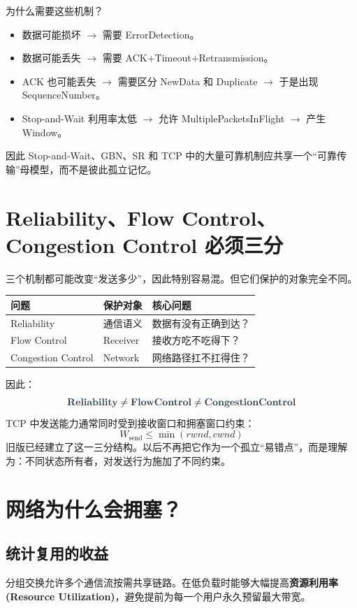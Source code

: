 \documentclass[11pt,a4paper,openany]{ctexbook}
\newcommand{\key}[1]{\textbf{\color{deep}#1}}
\begin{document}
为什么需要这些机制？
\begin{itemize}
    \item 数据可能损坏 $\rightarrow$ 需要 ErrorDetection。
    \item 数据可能丢失 $\rightarrow$ 需要 ACK+Timeout+Retransmission。
    \item ACK 也可能丢失 $\rightarrow$ 需要区分 NewData 和 Duplicate $\rightarrow$ 于是出现 SequenceNumber。
    \item Stop-and-Wait 利用率太低 $\rightarrow$ 允许 MultiplePacketsInFlight $\rightarrow$ 产生 Window。
\end{itemize}
因此 Stop-and-Wait、GBN、SR 和 TCP 中的大量可靠机制应共享一个“可靠传输”母模型，而不是彼此孤立记忆。

\section{Reliability、Flow Control、Congestion Control 必须三分}
三个机制都可能改变“发送多少”，因此特别容易混。但它们保护的对象完全不同。

\begin{longtable}{p{4.0cm}p{3.0cm}p{\dimexpr\linewidth-7.87cm\relax}}
\toprule
\textbf{问题} & \textbf{保护对象} & \textbf{核心问题}\\
\midrule
Reliability & 通信语义 & 数据有没有正确到达？ \\
Flow Control & Receiver & 接收方吃不吃得下？ \\
Congestion Control & Network & 网络路径扛不扛得住？ \\
\bottomrule
\end{longtable}

因此：
\[
\key{Reliability} \neq \key{FlowControl} \neq \key{CongestionControl}
\]
TCP 中发送能力通常同时受到接收窗口和拥塞窗口约束：
\[
W_{\text{send}} \le \min(rwnd,cwnd)
\]
旧版已经建立了这一三分结构。以后不再把它作为一个孤立“易错点”，而是理解为：不同状态所有者，对发送行为施加了不同约束。

\section{网络为什么会拥塞？}
\subsection{统计复用的收益}
分组交换允许多个通信流按需共享链路。在低负载时能够大幅提高\key{资源利用率 (Resource Utilization)}，避免提前为每一个用户永久预留最大带宽。
\end{document}
